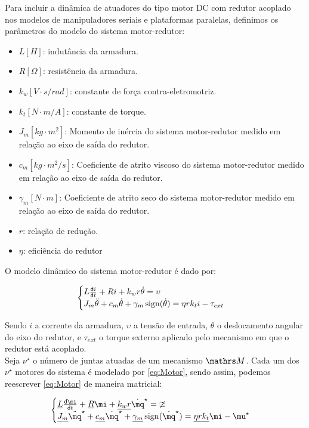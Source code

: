 \documentclass[a4paper,11pt,brazil,fleqn]{article}
\begin{document}
Para incluir a din\^amica de atuadores do tipo motor DC com redutor acoplado nos modelos de manipuladores seriais e plataformas paralelas, definimos os par\^ametros do modelo do sistema motor-redutor:

\begin{itemize}
\item $L [H]$: indut\^ancia da armadura.
\item $R [\Omega]$: resist\^encia da armadura.
\item $k_w [V \cdot s / rad]$: constante de for\c{c}a contra-eletromotriz.
\item $k_t[N \cdot m / A]$: constante de torque.
\item $J_m [kg \cdot m^2]$: Momento de in\'ercia do sistema motor-redutor medido em rela\c{c}\~ao ao eixo de sa\'ida do redutor.
\item $c_m [kg \cdot m^2/s]$: Coeficiente de atrito viscoso do sistema motor-redutor medido em rela\c{c}\~ao ao eixo de sa\'ida do redutor.
\item $\gamma_m [N \cdot m]$: Coeficiente de atrito seco do sistema motor-redutor medido em rela\c{c}\~ao ao eixo de sa\'ida do redutor.
\item $r$: rela\c{c}\~ao de redu\c{c}\~ao.
\item $\eta$: efici\^encia do redutor
\end{itemize}

O modelo din\^amico do sistema motor-redutor \'e dado por:

\begin{equation} \label{eq:Motor}
\begin{cases}
L \frac{\mathsf{d} i}{\mathsf{d} t} + R i + k_w r \dot{\theta} = \upsilon \\
J_m \ddot{\theta} + c_m \dot{\theta} + \gamma_m \operatorname*{sign}(\dot{\theta}) = \eta r k_t i - \tau_{ext}
\end{cases}
\end{equation}

Sendo $i$ a corrente da armadura, $\upsilon$ a tens\~ao de entrada, $\theta$ o deslocamento angular do eixo do redutor, e $\tau_{ext}$ o torque externo aplicado pelo mecanismo em que o redutor est\'a acoplado. \\

Seja $\nu^\star$ o n\'umero de juntas atuadas de um mecanismo $\ssM$. Cada um dos $\nu^\star$ motores do sistema \'e modelado por \eqref{eq:Motor}, sendo assim, podemos reescrever \eqref{eq:Motor} de maneira matricial:

\begin{equation} \label{eq:MotorMatriz}
\begin{cases}
\underline{L} \frac{\dd \mi}{\dd t} + \underline{R} \mi + \underline{k_w r} \dot{\mq}^\star = \mup  \\
\underline{J_m} \ddot{\mq}^\star + \underline{c_m} \dot{\mq}^\star + \underline{\gamma_m} \sign(\dot{\mq}^\star) = \underline{\eta r k_t} \mi - \mu^\star
\end{cases}
\end{equation}
\end{document}
